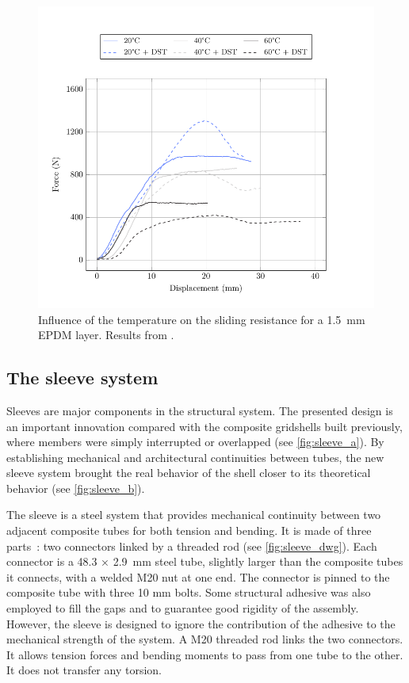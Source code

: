 \begin{figure}[p]
\centering
\begin{fullpage}
	\includegraphics[]{ch3_creteil/plot/2_epdm_temperature/build.pdf}
	\caption[Influence of the temperature on the sliding resistance]{Influence of the temperature on the sliding resistance for a \SI{1.5}{\mm} EPDM layer. Results from \cite{Tayeb2015a}.}
	\label{plot:epdm_temperature}
\end{fullpage}
\end{figure}


\clearpage
\subsection{The sleeve system}

Sleeves are major components in the structural system. The presented design is an important innovation compared with the composite gridshells built previously, where members were simply interrupted or overlapped (see \cref{fig:sleeve_a}). By establishing mechanical and architectural continuities between tubes, the new sleeve system brought the real behavior of the shell closer to its theoretical behavior (see \cref{fig:sleeve_b}).

The sleeve is a steel system that provides mechanical continuity between two adjacent composite tubes for both tension and bending. It is made of three parts~: two connectors linked by a threaded rod (see \cref{fig:sleeve_dwg}). Each connector is a 48.3 × \SI{2.9}{mm} steel tube, slightly larger than the composite tubes it connects, with a welded M20 nut at one end. The connector is pinned to the composite tube with three 10 mm bolts. Some structural adhesive was also employed to fill the gaps and to guarantee good rigidity of the assembly. However, the sleeve is designed to ignore the contribution of the adhesive to the mechanical strength of the system. A M20 threaded rod links the two connectors. It allows tension forces and bending moments to pass from one tube to the other. It does not transfer any torsion.

